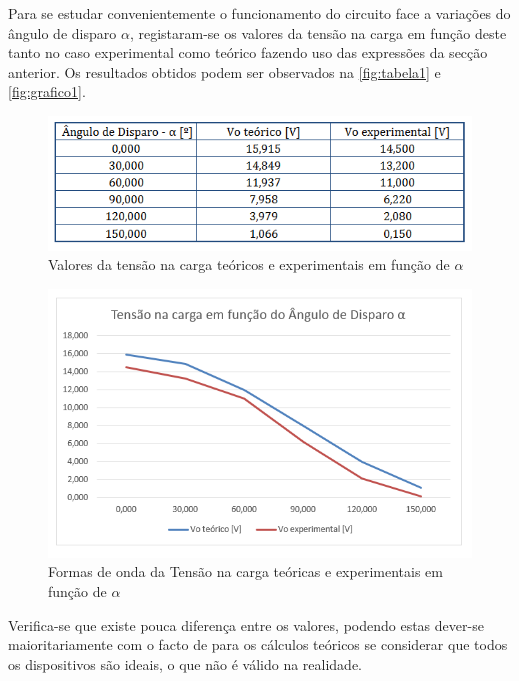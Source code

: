 \documentclass[a4paper,11pt]{article}
\numberwithin{equation}{section}
\begin{document}
Para se estudar convenientemente o funcionamento do circuito face a variações do ângulo de disparo $\alpha$, registaram-se os valores da tensão na carga em função deste tanto no caso experimental como teórico fazendo uso das expressões da secção anterior. Os resultados obtidos podem ser observados na \autoref{fig:tabela1} e \autoref{fig:grafico1}. 

\begin{figure}[h]
	\centering
	\includegraphics[keepaspectratio=true, scale=0.8]{teoricas/tabela1}
	\caption{Valores da tensão na carga teóricos e experimentais em função de $\alpha$}
	\label{fig:tabela1}
	\vspace{-0.8em}
\end{figure}

\begin{figure}[h]
	\centering
	\includegraphics[keepaspectratio=true, scale=0.8]{teoricas/grafico1}
	\caption{Formas de onda da Tensão na carga teóricas e experimentais em função de $\alpha$}
	\label{fig:grafico1}
	\vspace{-0.8em}
\end{figure}


Verifica-se que existe pouca diferença entre os valores, podendo estas dever-se maioritariamente com o facto de para os cálculos teóricos se considerar que todos os dispositivos são ideais, o que não é válido na realidade.
\end{document}
